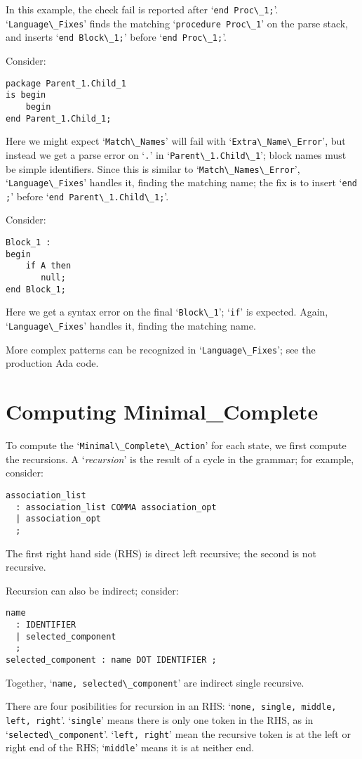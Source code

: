 \documentclass{article}
\newcommand{\code}[1]{`\lstinline|#1|'}
\begin{document}
In this example, the check fail is reported after \code{end Proc\_1;}.
\code{Language\_Fixes} finds the matching \code{procedure Proc\_1} on
the parse stack, and inserts \code{end Block\_1;} before
\code{end Proc\_1;}.

Consider:
\begin{lstlisting}
package Parent_1.Child_1
is begin
    begin
end Parent_1.Child_1;
\end{lstlisting}
Here we might expect \code{Match\_Names} will fail with
\code{Extra\_Name\_Error}, but instead we get a parse error on \code{.}
in \code{Parent\_1.Child\_1}; block names must be simple identifiers.
Since this is similar to \code{Match\_Names\_Error},
\code{Language\_Fixes} handles it, finding the matching name; the
fix is to insert \code{end ;} before \code{end Parent\_1.Child\_1;}.

Consider:
\begin{lstlisting}
Block_1 :
begin
    if A then
       null;
end Block_1;
\end{lstlisting}
Here we get a syntax error on the final \code{Block\_1}; \code{if} is
expected. Again, \code{Language\_Fixes} handles it, finding the
matching name.

More complex patterns can be recognized in \code{Language\_Fixes}; see
the production Ada code.

\section{Computing Minimal\_Complete}
\label{minimal-complete-compute}
To compute the \code{Minimal\_Complete\_Action} for each state, we
first compute the recursions. A `{\it recursion}' is the result of a
cycle in the grammar; for example, consider:
\begin{verbatim}
association_list
  : association_list COMMA association_opt
  | association_opt
  ;
\end{verbatim}
The first right hand side (RHS) is direct left recursive; the second
is not recursive.

Recursion can also be indirect; consider:
\begin{verbatim}
name
  : IDENTIFIER
  | selected_component
  ;
selected_component : name DOT IDENTIFIER ;
\end{verbatim}
Together, \code{name, selected\_component} are indirect single recursive.

There are four posibilities for recursion in an RHS: \code{none,
single, middle, left, right}. \code{single} means there is only one
token in the RHS, as in \code{selected\_component}. \code{left, right}
mean the recursive token is at the left or right end of the RHS;
\code{middle} means it is at neither end.
\end{document}
